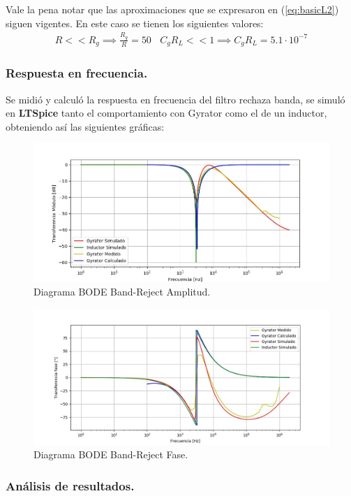 Vale la pena notar que las aproximaciones que se expresaron en (\ref{eq:basicL2}) siguen vigentes. En este caso se tienen los siguientes valores:
\begin{align}  R<<R_g \implies  \frac{R_g}{R}=  50 \ \ \ \ C_gR_L << 1 \implies C_gR_L =5.1 \cdot 10^{-7} \end{align}

\subsubsection{Respuesta en frecuencia.}

Se midió y calculó la respuesta en frecuencia del filtro rechaza banda, se simuló en \textbf{LTSpice} tanto el comportamiento con Gyrator como el de un inductor, obteniendo así las siguientes gráficas:
\begin{figure}[H]	
	\centering
	\includegraphics[width=\textwidth]{ImagenesEj2/bodebr.jpg}
	\caption{Diagrama BODE Band-Reject Amplitud.}
	\label{fig:bodebr}
\end{figure}
\begin{figure}[H]	
	\centering
	\includegraphics[width=\textwidth]{ImagenesEj2/bodebrp.jpg}
	\caption{Diagrama BODE Band-Reject Fase.}
	\label{fig:bodebrp}
\end{figure}
\subsubsection{Análisis de resultados.}

